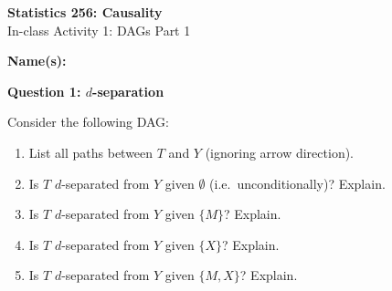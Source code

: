 \documentclass[11pt]{article}
\begin{document}
\begin{center}
{\Large \textbf{Statistics 256: Causality}} \\[6pt]
{\large In-class Activity 1: DAGs Part 1}
\end{center}

\vspace{4pt}
\noindent\textbf{Name(s):} \hrulefill

\vspace{16pt}

\noindent\textbf{Question 1: $d$-separation}

\medskip
\noindent Consider the following DAG:

\begin{center}
\end{center}

\begin{enumerate}[label=(\alph*)]
\item List all paths between $T$ and $Y$ (ignoring arrow direction).

\vspace{1.4cm}

\item Is $T$ $d$-separated from $Y$ given $\emptyset$ (i.e.\ unconditionally)? Explain.

\vspace{1.4cm}

\item Is $T$ $d$-separated from $Y$ given $\{M\}$? Explain.

\vspace{1.4cm}

\item Is $T$ $d$-separated from $Y$ given $\{X\}$? Explain.

\vspace{1.4cm}

\item Is $T$ $d$-separated from $Y$ given $\{M, X\}$? Explain.

\vspace{1.4cm}
\end{enumerate}
\end{document}
